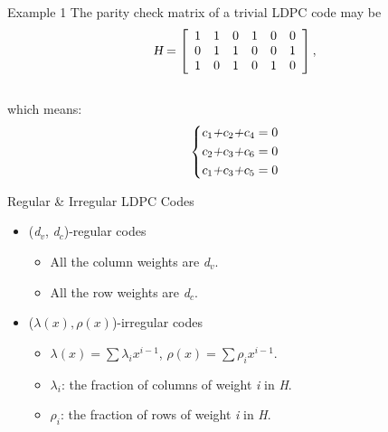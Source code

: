 \documentclass{beamer}
\newcommand{\xieti}{\textsl}
\begin{document}
\begin{frame}
    \begin{block}{Example 1}
        The parity check matrix of a trivial LDPC code may be
        \[
            \xieti{H}=
            \left[
            \begin{array}[]{cccccc}
            1 & 1 & 0 & 1 & 0 & 0 \\
            0 & 1 & 1 & 0 & 0 & 1 \\
            1 & 0 & 1 & 0 & 1 & 0
            \end{array}
            \right],
        \]\\
        which means:
        \begin{equation*}
            \left\{
            \begin{aligned}
            \xieti{c$_1$+c$_2$+c$_4$} = 0\\
            \xieti{c$_2$+c$_3$+c$_6$} = 0\\
            \xieti{c$_1$+c$_3$+c$_5$} = 0
            \end{aligned} \right.
        \end{equation*}
    \end{block}
\end{frame}

\begin{frame}
    \begin{block}{Regular \& Irregular LDPC Codes}
        \begin{itemize}
            \item(\xieti{d$_v$},  \xieti{d$_c$})-regular codes
                \begin{itemize}
                    \item All the column weights are \xieti{d$_v$}.
                    \item All the row weights are \xieti{d$_c$}.
                \end{itemize}
            \item ($\lambda(x), \rho(x)$)-irregular codes
                \begin{itemize}
                    \item  $\lambda(x) = \sum \lambda_ix^{i-1}$, $\rho(x) = \sum \rho_ix^{i-1}$.
                    \item $\lambda_i$: the fraction of columns of weight \xieti{i} in \xieti{H}.
                    \item $\rho_i$: the fraction of rows of weight \xieti{i} in \xieti{H}.
                \end{itemize}
        \end{itemize}
    \end{block}
\end{frame}
\end{document}

